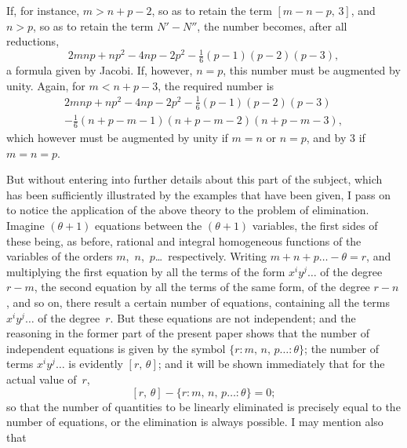 \documentclass[11pt,a4paper]{book}
\begin{document}
If, for instance, $m > n+p-2$, so as to retain the term $[m-n-p,\,3]$, and $n > p$, so as to retain the term $N'-N''$, the number becomes, after all reductions,
\[
2mnp + np^2 - 4np - 2p^2 - \tfrac{1}{6}(p-1)(p-2)(p-3),
\]
a formula given by Jacobi. If, however, $n=p$, this number must be augmented by unity. Again, for $m < n+p-3$, the required number is
\begin{multline*}
2mnp + np^2 - 4np - 2p^2 - \tfrac{1}{6}(p-1)(p-2)(p-3) \\
- \tfrac{1}{6}(n+p-m-1)(n+p-m-2)(n+p-m-3),
\end{multline*}
which however must be augmented by unity if $m=n$ or $n=p$, and by $3$ if $m=n=p$.

But without entering into further details about this part of the subject, which has been sufficiently illustrated by the examples that have been given, I pass on to notice the application of the above theory to the problem of elimination. Imagine $(\theta+1)$ equations between the $(\theta+1)$ variables, the first sides of these being, as before, rational and integral homogeneous functions of the variables of the orders $m$,~$n$,~$p$\ldots\ respectively. Writing $m+n+p\ldots - \theta = r$, and multiplying the first equation by all the terms of the form $x^i y^j \ldots$ of the degree $r-m$, the second equation by all the terms of the same form, of the degree $r-n$, and so on, there result a certain number of equations, containing all the terms $x^i y^j \ldots$ of the degree~$r$. But these equations are not independent; and the reasoning in the former part of the present paper shows that the number of independent equations is given by the symbol $\{r : m,\, n,\, p\ldots : \theta\}$; the number of terms $x^i y^j \ldots$ is evidently $[r,\,\theta]$; and it will be shown immediately that for the actual value of~$r$,
\[
[r,\,\theta] - \{r : m,\, n,\, p\ldots : \theta\} = 0 \tag{B};
\]
so that the number of quantities to be linearly eliminated is precisely equal to the number of equations, or the elimination is always possible. I may mention also that
\end{document}
